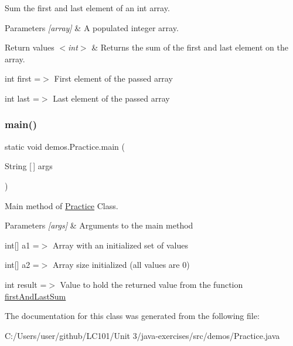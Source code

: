 Sum the first and last element of an int array. 
\begin{DoxyParams}{Parameters}
{\em \mbox{[}array\mbox{]}} & A populated integer array. \\
\hline
\end{DoxyParams}

\begin{DoxyRetVals}{Return values}
{\em $<$int$>$} & Returns the sum of the first and last element on the array. \\
\hline
\end{DoxyRetVals}
int first =$>$ First element of the passed array

int last =$>$ Last element of the passed array \mbox{\label{classdemos_1_1_practice_a532e88a74010a5527495460a783b8a75}} 
\subsubsection{\texorpdfstring{main()}{main()}}
{\footnotesize\ttfamily static void demos.\+Practice.\+main (\begin{DoxyParamCaption}\item[{String \mbox{[}$\,$\mbox{]}}]{args }\end{DoxyParamCaption})\hspace{0.3cm}{\ttfamily [static]}}

Main method of \mbox{\hyperlink{classdemos_1_1_practice}{Practice}} Class. 
\begin{DoxyParams}{Parameters}
{\em \mbox{[}args\mbox{]}} & Arguments to the main method \\
\hline
\end{DoxyParams}
int\mbox{[}\mbox{]} a1 =$>$ Array with an initialized set of values

int\mbox{[}\mbox{]} a2 =$>$ Array size initialized (all values are 0)

int result =$>$ Value to hold the returned value from the function \mbox{\hyperlink{classdemos_1_1_practice_a19ed9e7b2a95cdc9a8a03dc76289e6a5}{first\+And\+Last\+Sum}} 

The documentation for this class was generated from the following file\+:\begin{DoxyCompactItemize}
\item 
C\+:/\+Users/user/github/\+L\+C101/\+Unit 3/java-\/exercises/src/demos/Practice.\+java\end{DoxyCompactItemize}
